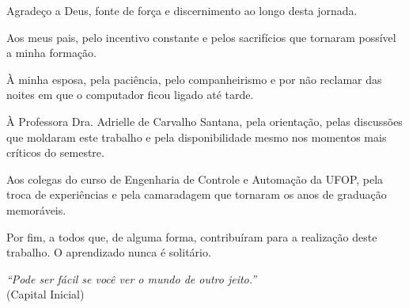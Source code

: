 \documentclass[
  12pt,
  openright,
  twoside,
  a4paper,
  english,
  brazil
]{abntex2}
\begin{document}
\begin{agradecimentos}
\noindent
Agradeço a Deus, fonte de força e discernimento ao longo desta jornada.

Aos meus pais, pelo incentivo constante e pelos sacrifícios que tornaram
possível a minha formação.

À minha esposa, pela paciência, pelo companheirismo e por não reclamar
das noites em que o computador ficou ligado até tarde.

À Professora Dra. Adrielle de Carvalho Santana, pela orientação, pelas
discussões que moldaram este trabalho e pela disponibilidade mesmo nos
momentos mais críticos do semestre.

Aos colegas do curso de Engenharia de Controle e Automação da UFOP, pela
troca de experiências e pela camaradagem que tornaram os anos de
graduação memoráveis.

Por fim, a todos que, de alguma forma, contribuíram para a realização
deste trabalho. O aprendizado nunca é solitário.
\end{agradecimentos}

\begin{epigrafe}
  \vspace*{\fill}
  \begin{flushright}
    \textit{``Pode ser fácil se você ver o mundo de outro jeito.''}\\
    (Capital Inicial)
  \end{flushright}
\end{epigrafe}
\end{document}
